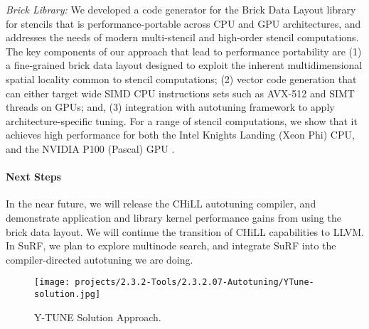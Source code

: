 \vspace*{.1in}
\noindent
\textit{Brick Library:}
We developed a code generator for the Brick Data Layout library for stencils
that is performance-portable across CPU and GPU architectures, and addresses the
needs of modern multi-stencil and high-order stencil computations. The key
components of our approach that lead to performance portability are (1) a
fine-grained brick data layout designed to exploit the inherent multidimensional
spatial locality common to stencil computations; (2) vector code generation that
can either target wide SIMD CPU instructions sets such as AVX-512 and SIMT
threads on GPUs; and, (3) integration with autotuning framework to apply
architecture-specific tuning. For a range of stencil computations, we show that
it achieves high performance for both the Intel Knights Landing (Xeon Phi) CPU,
and the NVIDIA P100 (Pascal) GPU \cite{P3HPC_Bricks}. 

\paragraph{Next Steps}
In the near future, we will release the CHiLL autotuning compiler, and
demonstrate application and library kernel performance gains from 
using the brick data layout.  We will continue the transition of CHiLL capabilities to LLVM.
In SuRF, we plan to explore multinode search, and integrate SuRF into the compiler-directed autotuning we are doing.

\begin{figure}[h]
\begin{center}
\texttt{[image: projects/2.3.2-Tools/2.3.2.07-Autotuning/YTune-solution.jpg]}
\end{center}
\caption{Y-TUNE Solution Approach.}
\end{figure}

%
